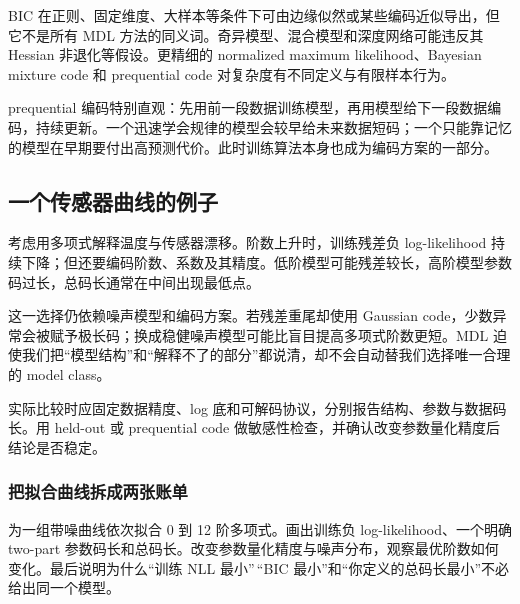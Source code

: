 BIC 在正则、固定维度、大样本等条件下可由边缘似然或某些编码近似导出，但它不是所有 MDL 方法的同义词。奇异模型、混合模型和深度网络可能违反其 Hessian 非退化等假设。更精细的 normalized maximum likelihood、Bayesian mixture code 和 prequential code 对复杂度有不同定义与有限样本行为。

prequential 编码特别直观：先用前一段数据训练模型，再用模型给下一段数据编码，持续更新。一个迅速学会规律的模型会较早给未来数据短码；一个只能靠记忆的模型在早期要付出高预测代价。此时训练算法本身也成为编码方案的一部分。

\subsection{一个传感器曲线的例子}

考虑用多项式解释温度与传感器漂移。阶数上升时，训练残差负 log-likelihood 持续下降；但还要编码阶数、系数及其精度。低阶模型可能残差较长，高阶模型参数码过长，总码长通常在中间出现最低点。

这一选择仍依赖噪声模型和编码方案。若残差重尾却使用 Gaussian code，少数异常会被赋予极长码；换成稳健噪声模型可能比盲目提高多项式阶数更短。MDL 迫使我们把``模型结构''和``解释不了的部分''都说清，却不会自动替我们选择唯一合理的 model class。

实际比较时应固定数据精度、log 底和可解码协议，分别报告结构、参数与数据码长。用 held-out 或 prequential code 做敏感性检查，并确认改变参数量化精度后结论是否稳定。

\subsubsection{把拟合曲线拆成两张账单}

为一组带噪曲线依次拟合 0 到 12 阶多项式。画出训练负 log-likelihood、一个明确 two-part 参数码长和总码长。改变参数量化精度与噪声分布，观察最优阶数如何变化。最后说明为什么``训练 NLL 最小''\,``BIC 最小''和``你定义的总码长最小''不必给出同一个模型。
